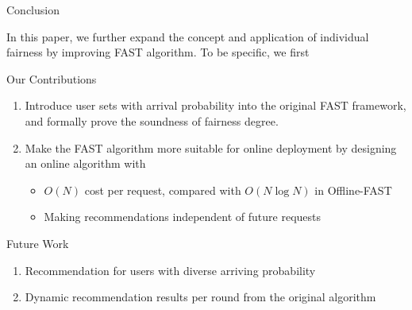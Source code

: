 
\begin{frame}{Conclusion}

In this paper, we further expand the concept and application of individual fairness by improving FAST algorithm. To be specific, we first 

\begin{block}{Our Contributions}
\begin{enumerate}
    \item Introduce user sets with arrival probability into the original FAST framework, and formally prove the soundness of fairness degree.
    \item Make the FAST algorithm more suitable for online deployment by designing an online algorithm with
    \begin{itemize}
        \item $O(N)$ cost per request, compared with $O(N \log N)$ in Offline-FAST
        \item Making recommendations independent of future requests
    \end{itemize}
\end{enumerate}
\end{block}

\begin{block}{Future Work}
\begin{enumerate}
    \item Recommendation for users with diverse arriving probability
    \item Dynamic recommendation results per round from the original algorithm
\end{enumerate}
\end{block}
\end{frame}
